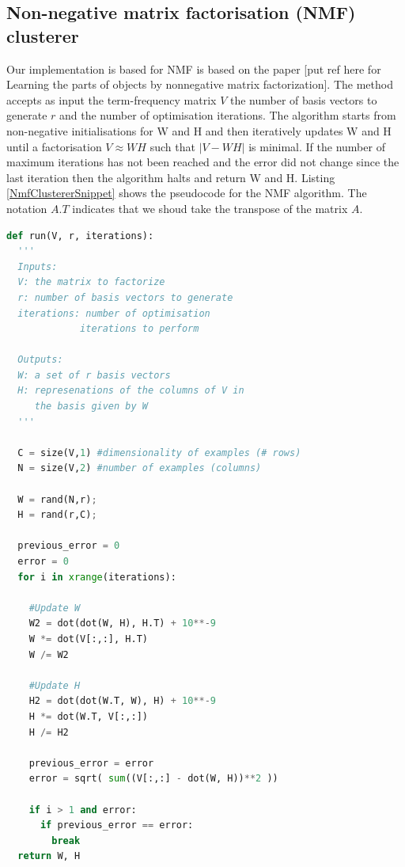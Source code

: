 \subsection{Non-negative matrix factorisation (NMF) clusterer} Our implementation is based for NMF is based on the paper [put ref here for Learning the parts of objects by nonnegative matrix factorization]. The method accepts as input the term-frequency matrix $V$ the number of basis vectors to generate $r$ and the number of optimisation iterations. The algorithm starts from non-negative initialisations for W and H and then iteratively updates W and H until a factorisation $V \approx WH$ such that $| V - WH |$ is minimal. If the number of maximum iterations has not been reached and the error did not change since the last iteration then the algorithm halts and return W and H. Listing \ref{NmfClustererSnippet} shows the pseudocode for the NMF algorithm. The notation $A.T$ indicates that we shoud take the transpose of the matrix $A$.
  
\begin{lstlisting}[language=Python, label=NmfClustererSnippet, caption=Pseudocode for the NMF algorithm]
def run(V, r, iterations):
  '''
  Inputs: 
  V: the matrix to factorize
  r: number of basis vectors to generate
  iterations: number of optimisation
             iterations to perform
  
  Outputs:
  W: a set of r basis vectors
  H: represenations of the columns of V in 
     the basis given by W
  '''
  
  C = size(V,1) #dimensionality of examples (# rows)
  N = size(V,2) #number of examples (columns)

  W = rand(N,r);
  H = rand(r,C);
  
  previous_error = 0
  error = 0
  for i in xrange(iterations):

    #Update W
    W2 = dot(dot(W, H), H.T) + 10**-9
    W *= dot(V[:,:], H.T)
    W /= W2
    
    #Update H
    H2 = dot(dot(W.T, W), H) + 10**-9
    H *= dot(W.T, V[:,:])
    H /= H2                                     
    
    previous_error = error
    error = sqrt( sum((V[:,:] - dot(W, H))**2 ))
    
    if i > 1 and error:
      if previous_error == error:
        break
  return W, H
  
\end{lstlisting}

